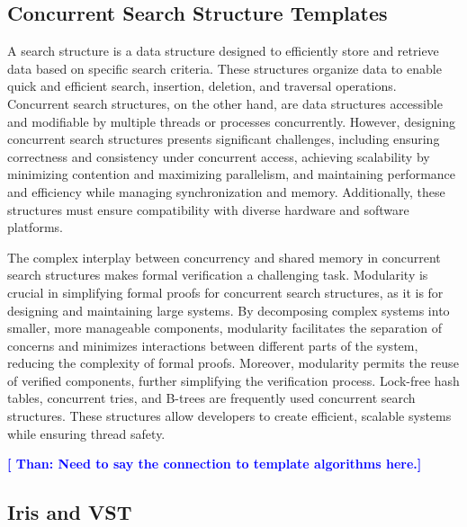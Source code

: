 \documentclass[a4paper,UKenglish,cleveref, autoref, thm-restate]{lipics-v2021}
\newcommand{\than}[1]{\textbf{\textcolor{blue}{[ Than: #1]}}}
\begin{document}
\subsection{Concurrent Search Structure Templates}
A search structure is a data structure designed to efficiently store and retrieve data based on specific search criteria. These structures organize data to enable quick and efficient search, insertion, deletion, and traversal operations. Concurrent search structures, on the other hand, are data structures accessible and modifiable by multiple threads or processes concurrently. However, designing concurrent search structures presents significant challenges, including ensuring correctness and consistency under concurrent access, achieving scalability by minimizing contention and maximizing parallelism, and maintaining performance and efficiency while managing synchronization and memory. Additionally, these structures must ensure compatibility with diverse hardware and software platforms.

The complex interplay between concurrency and shared memory in concurrent search structures makes formal verification a challenging task. Modularity is crucial in simplifying formal proofs for concurrent search structures, as it is for designing and maintaining large systems. By decomposing complex systems into smaller, more manageable components, modularity facilitates the separation of concerns and minimizes interactions between different parts of the system, reducing the complexity of formal proofs. Moreover, modularity permits the reuse of verified components, further simplifying the verification process. Lock-free hash tables, concurrent tries, and B-trees are frequently used concurrent search structures. These structures allow developers to create efficient, scalable systems while ensuring thread safety.

\than{Need to say the connection to template algorithms here.} 



\subsection{Iris and VST}
\end{document}
